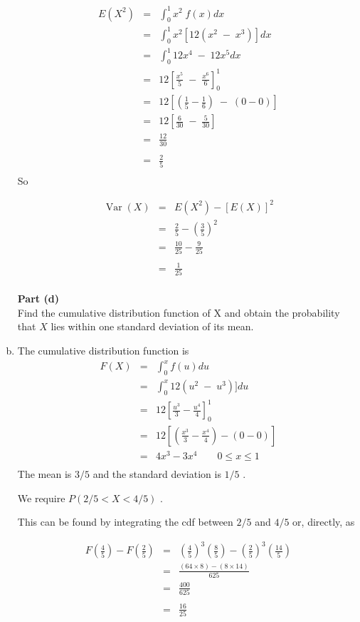 \documentclass[a4paper,12pt]{article}
\begin{document}
\begin{enumerate}[(a)]
\large
\begin{eqnarray*}
E(X^2) &=& \int^{1}_{0} x^2 \;f(x) dx \\
&=& \int^{1}_{0} x^2[12(x^2\;-\;x^3)] dx \\
&=& \int^{1}_{0} 12x^4\;-\;12x^5 dx \\
&=& 12 \left[ \frac{x^5}{5} \;-\; \frac{x^6}{6}\right]^1_0\\
&=& 12 \left[ \left( \frac{1}{5}-\frac{1}{6} \right) \;-\; \left(0 - 0 \right)  \right]\\
&=& 12 \left[  \frac{6}{30} \;-\; \frac{5}{30} \right]\\
&=&  \frac{12}{30} \\
& & \\
&=&  \frac{2}{5}\\
\end{eqnarray*}
So 

\begin{eqnarray*}
\operatorname{Var}(X) &=& E(X^2) - [E(X)]^2 \\
 &=& \frac{2}{5} - \left(\frac{3}{5}\right)^2 \\
 &=& \frac{10}{25} - \frac{9}{25} \\
 & & \\
 &=& \frac{1}{25} \\
\end{eqnarray*}
\newpage
\begin{framed}
\noindent \textbf{Part (d)}\\
 Find the cumulative distribution function of X and obtain the probability that $X$
lies within one standard deviation of its mean.

\end{framed}
\item  The cumulative distribution function is
\begin{eqnarray*}
F(X) &=& \int^{x}_{0} f(u) du \\
&=& \int^{x}_{0} 12(u^2\;-\;u^3)] du \\
&=& 12 \left[ \frac{u^3}{3} - \frac{u^4}{4}\right]^1_0\\
&=& 12 \left[ \left( \frac{x^3}{3}- \frac{x^4}{4} \right) - \left( 0 - 0 \right)  \right]\\
&=&  4x^3- 3x^4  \qquad 0 \leq x \leq 1 \\
\end{eqnarray*}
The mean is $3/5$
and the standard deviation is $1/5$ . 

We require  $P(2/5 < X < 4/5)$ .

This can be found by integrating the cdf between $2/5$ and $4/5$ or, directly, as

\begin{eqnarray*}
F\left(\frac{4}{5}\right) - F\left(\frac{2}{5}\right) &=& \left(\frac{4}{5}\right)^3\left(\frac{8}{5}\right) - \left(\frac{2}{5}\right)^3\left(\frac{14}{5}\right)\\
&=& \frac{(64 \times 8) - (8 \times 14)}{625} \\
&=& \frac{400}{625} \\
& & \\
&=& \frac{16}{25}
\end{eqnarray*}

\end{enumerate}
\end{document}
